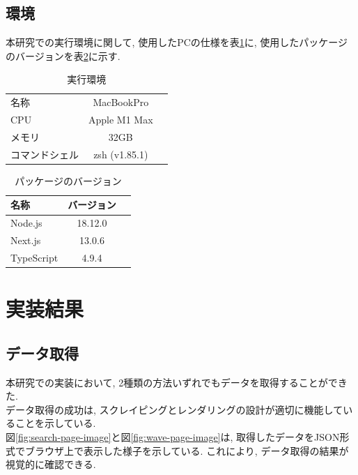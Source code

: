 \subsection{環境}
本研究での実行環境に関して, 使用したPCの仕様を表\ref{table:zikkoukannkyo}に, 使用したパッケージのバージョンを表\ref{table:version}に示す. 

\begin{table}[hbtp]
	\caption{実行環境}
	\label{table:zikkoukannkyo}
	\centering
	\begin{tabular}{lcr}
		\hline
		名称      & MacBookPro    \\
		CPU     & Apple M1 Max  \\
		メモリ     & 32GB          \\
		コマンドシェル & zsh (v1.85.1) \\
		\hline
	\end{tabular}
\end{table}

\begin{table}[hbtp]
	\caption{パッケージのバージョン}
	\label{table:version}
	\centering
	\begin{tabular}{lcr}
		\hline
		名称         & バージョン   \\
		\hline \hline
		Node.js    & 18.12.0 \\
		Next.js    & 13.0.6  \\
		TypeScript & 4.9.4   \\
		\hline
	\end{tabular}
\end{table}


\section{実装結果}
\subsection{データ取得}
本研究での実装において, 2種類の方法いずれでもデータを取得することができた. \\
データ取得の成功は, スクレイピングとレンダリングの設計が適切に機能していることを示している. \\
図\ref{fig:search-page-image}と図\ref{fig:wave-page-image}は, 取得したデータをJSON形式でブラウザ上で表示した様子を示している. 
これにより, データ取得の結果が視覚的に確認できる. 

